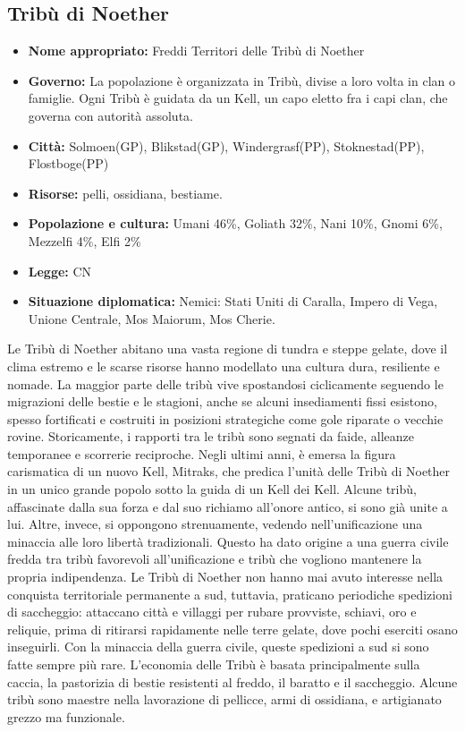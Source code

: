\documentclass[10pt, a4paper]{report}
\begin{document}
\begin{multicols}{2}
\subsection*{Tribù di Noether}
\begin{itemize}
	\item \textbf{Nome appropriato:} Freddi Territori delle Tribù di Noether
	\item \textbf{Governo:} La popolazione è organizzata in Tribù, divise a loro volta in clan o famiglie. Ogni Tribù è guidata da un Kell, un capo eletto fra i capi clan, che governa con autorità assoluta. 
	\item \textbf{Città:} Solmoen(GP), Blikstad(GP), Windergrasf(PP), Stoknestad(PP), Flostboge(PP)
	\item \textbf{Risorse:} pelli, ossidiana, bestiame. 
	\item \textbf{Popolazione e cultura:} Umani 46\%, Goliath 32\%, Nani 10\%, Gnomi 6\%, Mezzelfi 4\%, Elfi 2\% 
	\item \textbf{Legge:} CN
	\item \textbf{Situazione diplomatica:} Nemici: Stati Uniti di Caralla, Impero di Vega, Unione Centrale, Mos Maiorum, Mos Cherie.
\end{itemize}
Le Tribù di Noether abitano una vasta regione di tundra e steppe gelate, dove il clima estremo e le scarse risorse hanno modellato una cultura dura, resiliente e nomade. La maggior parte delle tribù vive spostandosi ciclicamente seguendo le migrazioni delle bestie e le stagioni, anche se alcuni insediamenti fissi esistono, spesso fortificati e costruiti in posizioni strategiche come gole riparate o vecchie rovine. Storicamente, i rapporti tra le tribù sono segnati da faide, alleanze temporanee e scorrerie reciproche. Negli ultimi anni, è emersa la figura carismatica di un nuovo Kell, Mitraks, che predica l'unità delle Tribù di Noether in un unico grande popolo sotto la guida di un Kell dei Kell. Alcune tribù, affascinate dalla sua forza e dal suo richiamo all'onore antico, si sono già unite a lui. Altre, invece, si oppongono strenuamente, vedendo nell'unificazione una minaccia alle loro libertà tradizionali.
Questo ha dato origine a una guerra civile fredda tra tribù favorevoli all'unificazione e tribù che vogliono mantenere la propria indipendenza.
Le Tribù di Noether non hanno mai avuto interesse nella conquista territoriale permanente a sud, tuttavia, praticano periodiche spedizioni di saccheggio: attaccano città e villaggi per rubare provviste, schiavi, oro e reliquie, prima di ritirarsi rapidamente nelle terre gelate, dove pochi eserciti osano inseguirli. Con la minaccia della guerra civile, queste spedizioni a sud si sono fatte sempre più rare. L'economia delle Tribù è basata principalmente sulla caccia, la pastorizia di bestie resistenti al freddo, il baratto e il saccheggio. Alcune tribù sono maestre nella lavorazione di pellicce, armi di ossidiana, e artigianato grezzo ma funzionale.


\end{multicols}
\end{document}
